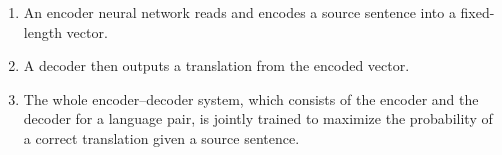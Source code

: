 \begin{enumerate}
    \item An encoder neural network reads and encodes a source sentence into a fixed-length vector.
    \hfill \cite{adv-ml-tech/paper/arxiv.org/1409.0473}

    \item A decoder then outputs a translation from the encoded vector.
    \hfill \cite{adv-ml-tech/paper/arxiv.org/1409.0473}

    \item The whole encoder–decoder system, which consists of the encoder and the decoder for a language pair, is jointly trained to maximize the probability of a correct translation given a source sentence.
    \hfill \cite{adv-ml-tech/paper/arxiv.org/1409.0473}
\end{enumerate}





